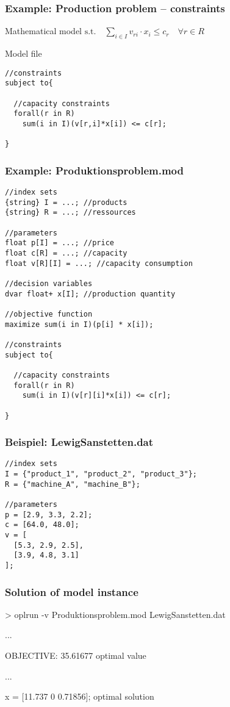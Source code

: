 \begin{frame}[fragile]\small
 \frametitle{Example: Production problem -- constraints}
 \begin{block}{Mathematical model}
  $\text{s.t.}\quad\displaystyle\sum_{i\in I} v_{ri}\cdot x_i \leq c_r  \quad\forall r\in R$
 \end{block}
 \begin{block}{Model file}\scriptsize
\begin{lstlisting}[numbers=none]
//constraints
subject to{
  
  //capacity constraints
  forall(r in R)
    sum(i in I)(v[r,i]*x[i]) <= c[r];
  
}  
\end{lstlisting}
 \end{block}
\end{frame}

\begin{frame}[fragile]
 \frametitle{Example: Produktionsproblem.mod}
 \medskip
\begin{lstlisting}[basicstyle=\scriptsize\ttfamily]
//index sets
{string} I = ...; //products
{string} R = ...; //ressources

//parameters
float p[I] = ...; //price
float c[R] = ...; //capacity
float v[R][I] = ...; //capacity consumption

//decision variables
dvar float+ x[I]; //production quantity

//objective function
maximize sum(i in I)(p[i] * x[i]);

//constraints
subject to{
  
  //capacity constraints
  forall(r in R)
    sum(i in I)(v[r][i]*x[i]) <= c[r];
  
}   
\end{lstlisting}
\end{frame}

\begin{frame}[fragile]
 \frametitle{Beispiel: LewigSanstetten.dat}
 \medskip
\begin{lstlisting}[basicstyle=\scriptsize\ttfamily]
//index sets
I = {"product_1", "product_2", "product_3"}; 
R = {"machine_A", "machine_B"}; 
 
//parameters
p = [2.9, 3.3, 2.2];
c = [64.0, 48.0];
v = [
  [5.3, 2.9, 2.5],
  [3.9, 4.8, 3.1]
]; 
\end{lstlisting}
\end{frame}

\begin{frame}
 \frametitle{Solution of model instance}
 \ttfamily
 > oplrun -v Produktionsproblem.mod LewigSanstetten.dat
 \begin{center}
  \textsf ...
 \end{center}
 OBJECTIVE: 35.61677 \hfill\alert{\textsf{\textleftarrow{} optimal value}}
 \begin{center}
  \textsf ...
 \end{center}
 x = [11.737 0 0.71856]; \hfill\alert{\textsf{\textleftarrow{} optimal solution}}
\end{frame}
